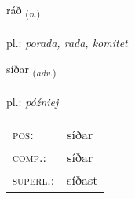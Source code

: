 \documentclass[frontgrid, backgrid]{flacards}\usepackage[]{graphicx}\usepackage[]{xcolor}
\begin{document}
\renewcommand{\blhead}{\vskip5pt {\small\bfseries\footnotesize Nafnorð | Noun }}
\renewcommand{\bcfoot}{\vskip5pt \hspace{2pt}{\small\bfseries\footnotesize 1K}}


{ráð \small{\textsubscript{(\textit{n.})}} \\[1ex] %
\textphonetic{[rauːð]} \\
pl.: \emph{porada, rada, komitet} \\  [2ex]
\renewcommand*{\arraystretch}{0.8}
}

\renewcommand{\flhead}{\vskip5pt \fboxsep=0pt {\small\bfseries\footnotesize Atviksorð | Adverb}}
\renewcommand{\fcfoot}{\vskip5pt \fboxsep=0pt \hspace{2pt}{\small\bfseries\footnotesize 1K}}

\renewcommand{\blhead}{\vskip5pt {\small\bfseries\footnotesize Atviksorð | Adverb }}
\renewcommand{\bcfoot}{\vskip5pt \hspace{2pt}{\small\bfseries\footnotesize 1K}}


{síðar \small{\textsubscript{(\textit{adv.})}} \\[1ex] %
\textphonetic{[siːðar]} \\
pl.: \emph{później} \\  [2ex]
\renewcommand*{\arraystretch}{0.8}
\begin{tabular}{ll}
\textsc{pos}: & síðar \\ 
\textsc{comp.}: & síðar \\ 
\textsc{superl.}: & síðast \\
\end{tabular}
}

\renewcommand{\flhead}{\vskip5pt \fboxsep=0pt {\small\bfseries\footnotesize Sagnorð | Verb}}
\renewcommand{\fcfoot}{\vskip5pt \fboxsep=0pt \hspace{2pt}{\small\bfseries\footnotesize 1K}}
\end{document}

